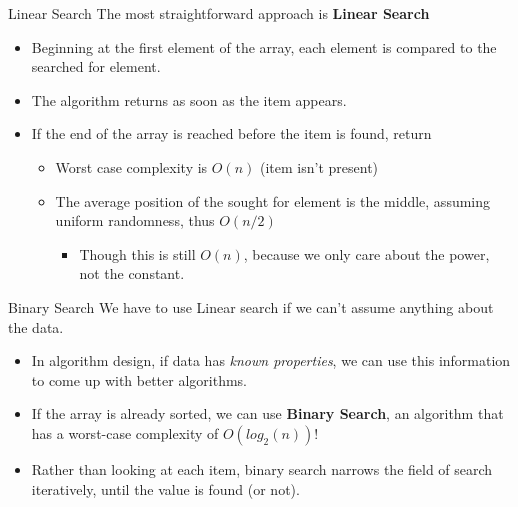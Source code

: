 \documentclass[11pt]{beamer}
\let\OldTexttt\texttt
\renewcommand{\texttt}[1]{\OldTexttt{\color{teal}{#1}}}
\begin{document}
\begin{frame}{Linear Search}
The most straightforward approach is \textbf{Linear Search}
\begin{itemize}
\item Beginning at the first element of the array, each element is compared to the searched for element.  
\item The algorithm returns \texttt{True} as soon as the item appears.
\item If the end of the array is reached before the item is found, return \texttt{False}
\begin{itemize}
\item Worst case complexity is $O(n)$ (item isn't present)
\item The average position of the sought for element is the middle, assuming uniform randomness, thus $O(n/2)$
\begin{itemize}
\item Though this is still $O(n)$, because we only care about the power, not the constant.  
\end{itemize}
\end{itemize}
\end{itemize}
\end{frame}

\begin{frame}{Binary Search}
We have to use Linear search if we can't assume anything about the data.
\begin{itemize}
\item In algorithm design, if data has \emph{known properties}, we can use this information to come up with better algorithms.
\item If the array is already sorted, we can use \textbf{Binary Search}, an algorithm that has a worst-case complexity of $O(log_2(n))$! 
\item Rather than looking at each item, binary search narrows the field of search iteratively, until the value is found (or not).
\end{itemize}
\end{frame}
\end{document}
